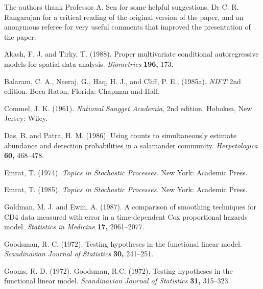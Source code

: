 \documentclass[useAMS,usenatbib]{biom}
\begin{document}
The authors thank Professor A. Sen for some helpful suggestions,
Dr C. R. Rangarajan for a critical reading of the original version of the
paper, and an anonymous referee for very useful comments that improved
the presentation of the paper.\vspace*{-8pt}




\begin{thebibliography}{}
Akash, F. J. and Tirky, T. (1988). Proper multivariate conditional
autoregressive models for spatial data analysis. {\it Biometrics} {\bf 196,} 173.

Balaram, C. A., Neeraj, G., Haq, H. J., and Cliff, P. E., (1985a). {\it
NIFT\/} 2nd edition. Boca Raton, Florida: Chapman and Hall.

Commel, J. K. (1961). {\it National Sangget Academia}, 2nd edition.
Hoboken, New Jersey: Wiley.

Das, B. and Patra, H. M. (1986). Using counts to simultaneously estimate
abundance and detection probabilities in a salamander community. {\it
Herpetologica} {\bf 60,} 468--478.

 Emrat, T. (1974).
{\it Topics in Stochastic Processes.} New York: Academic  Press.

 Emrat, T. (1985).
{\it Topics in Stochastic Processes.} New York: Academic  Press.

Goldman, M. J. and Ewin, A. (1987). A comparison of smoothing
techniques for CD4 data measured with error in a time-dependent Cox
proportional hazards model. {\it Statistics in Medicine} {\bf 17,} 2061--2077.

Goodsman, R. C. (1972). Testing hypotheses in the functional linear
model. {\it Scandinavian Journal of Statistics} {\bf 30,} 241--251.

 Gooms, R. D.
(1972). Goodsman, R.C. (1972). Testing hypotheses in the functional linear
model. {\it Scandinavian Journal of Statistics} {\bf 31,} 315--323.



\end{thebibliography}
\end{document}
